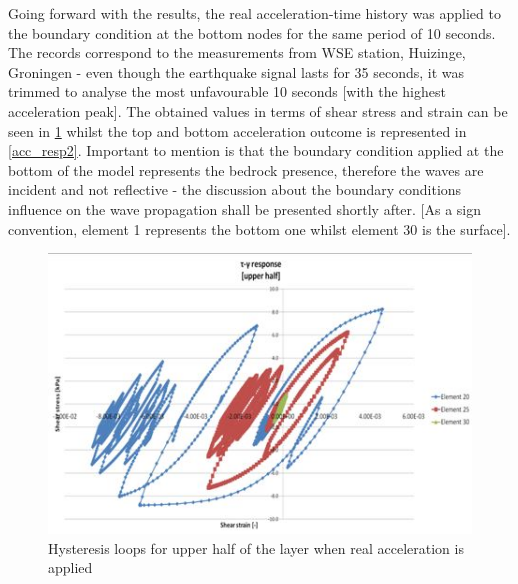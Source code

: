 \documentclass[10pt,a4paper]{report}
\begin{document}
Going forward with the results, the real acceleration-time history was applied to the boundary condition at the bottom nodes for the same period of 10 seconds. The records correspond to the measurements from WSE station, Huizinge, Groningen - even though the earthquake signal lasts for 35 seconds, it was trimmed to analyse the most unfavourable 10 seconds [with the highest acceleration peak]. The obtained values in terms of shear stress and strain can be seen in \ref{resp3} whilst the top and bottom acceleration outcome is represented in \ref{acc_resp2}. Important to mention is that the boundary condition applied at the bottom of the model represents the bedrock presence, therefore the waves are incident and not reflective - the discussion about the boundary conditions influence on the wave propagation shall be presented shortly after. [As a sign convention, element 1 represents the bottom one whilst element 30 is the surface].
\begin{figure} [h!]
	\centering
	\includegraphics[width=0.7\linewidth]{"response3"}
	\caption{Hysteresis loops for upper half of the layer when real acceleration is applied}
	\label{resp3}
\end{figure}
\end{document}
